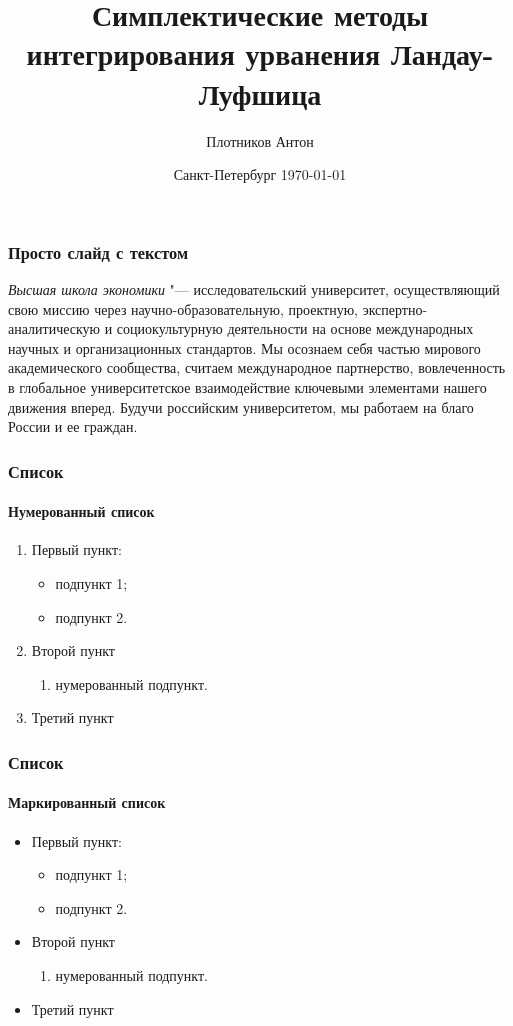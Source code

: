 \documentclass{beamer}
\title[Симп. мет. инт. ур-я Ландау-Лифшица]{Симплектические методы интегрирования\linebreak 
    урванения Ландау-Луфшица}
\author{Плотников Антон}
\date{Санкт-Петербург \today}
\begin{document}
\frame[plain]{\titlepage}

\begin{frame}
\frametitle{Просто слайд с текстом}
	\emph{Высшая школа экономики} "--- исследовательский университет, осуществляющий свою миссию через научно-образовательную, проектную, экспертно-аналитическую и социокультурную деятельности на основе международных научных и организационных стандартов. Мы осознаем себя частью мирового академического сообщества, считаем международное партнерство, вовлеченность в глобальное университетское взаимодействие ключевыми элементами нашего движения вперед. Будучи российским университетом, мы работаем на благо России и ее граждан.
\end{frame}

\begin{frame}
\frametitle{Список}
\framesubtitle{Нумерованный список}
	\begin{enumerate} 
		\item Первый пункт:
		\begin{itemize}
			\item подпункт 1;
			\item подпункт 2.
		\end{itemize}
		\item Второй пункт
		\begin{enumerate}
			\item нумерованный подпункт.
		\end{enumerate} 
		\item Третий пункт
	\end{enumerate} 
\end{frame}

\begin{frame}
\frametitle{Список}
\framesubtitle{Маркированный список}
	\begin{itemize}
		\item Первый пункт:
		\begin{itemize}
			\item подпункт 1;
			\item подпункт 2.
		\end{itemize}
		\item Второй пункт
		\begin{enumerate}
			\item нумерованный подпункт.
		\end{enumerate}
		\item Третий пункт
	\end{itemize}
\end{frame}
\end{document}
